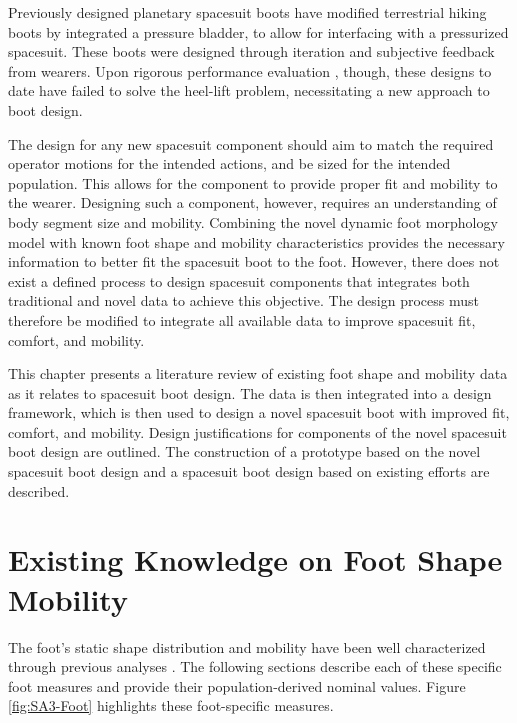\documentclass[defaultstyle,11pt]{thesis}
\begin{document}
Previously designed planetary spacesuit boots have modified terrestrial hiking boots by integrated a pressure bladder, to allow for interfacing with a pressurized spacesuit.
These boots were designed through iteration and subjective feedback from wearers.
Upon rigorous performance evaluation \citep{Ross2002, Fineman2018}, though, these designs to date have failed to solve the heel-lift problem, necessitating a new approach to boot design.

The design for any new spacesuit component should aim to match the required operator motions for the intended actions, and be sized for the intended population.
This allows for the component to provide proper fit and mobility to the wearer.
Designing such a component, however, requires an understanding of body segment size and mobility.
Combining the novel dynamic foot morphology model with known foot shape and mobility characteristics provides the necessary information to better fit the spacesuit boot to the foot.
However, there does not exist a defined process to design spacesuit components that integrates both traditional and novel data to achieve this objective.
The design process must therefore be modified to integrate all available data to improve spacesuit fit, comfort, and mobility.

This chapter presents a literature review of existing foot shape and mobility data as it relates to spacesuit boot design.
The data is then integrated into a design framework, which is then used to design a novel spacesuit boot with improved fit, comfort, and mobility.
Design justifications for components of the novel spacesuit boot design are outlined.
The construction of a prototype based on the novel spacesuit boot design and a spacesuit boot design based on existing efforts are described.

\hypertarget{existing-knowledge-on-foot-shape-mobility}{%
\section{Existing Knowledge on Foot Shape Mobility}\label{existing-knowledge-on-foot-shape-mobility}}

The foot's static shape distribution and mobility have been well characterized through previous analyses \citep{Farris2019, Mann1979, Voloshina2013, Wannop2014}.
The following sections describe each of these specific foot measures and provide their population-derived nominal values.
Figure \ref{fig:SA3-Foot} highlights these foot-specific measures.
\end{document}
